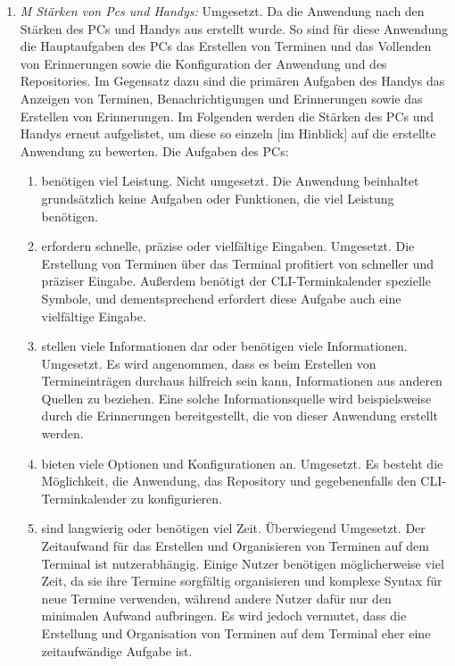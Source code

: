 \begin{enumerate}
	\item \textit{M Stärken von Pcs und Handys:}\newline%
		Umgesetzt. Da die Anwendung nach den Stärken des PCs und Handys aus  erstellt wurde. %
			So sind für diese Anwendung die Hauptaufgaben des PCs das Erstellen von Terminen und das Vollenden von Erinnerungen sowie die Konfiguration der Anwendung und des Repositories. Im Gegensatz dazu sind die primären Aufgaben des Handys das Anzeigen von Terminen, Benachrichtigungen und Erinnerungen sowie das Erstellen von Erinnerungen.\newline%
			Im Folgenden werden die Stärken des PCs und Handys erneut aufgelistet, um diese so einzeln [im Hinblick] auf die erstellte Anwendung zu bewerten.\newline%
		\myNewSection
		Die Aufgaben des PCs:%
  		\begin{enumerate}[label*={\arabic*}]
			\item benötigen viel Leistung.\newline%
				Nicht umgesetzt. Die Anwendung beinhaltet grundsätzlich keine Aufgaben oder Funktionen, die viel Leistung benötigen.%
			\item erfordern schnelle, präzise oder vielfältige Eingaben.\newline%
				Umgesetzt. Die Erstellung von Terminen über das Terminal profitiert von schneller und präziser Eingabe. Außerdem benötigt der CLI-Terminkalender spezielle Symbole, und dementsprechend erfordert diese Aufgabe auch eine vielfältige Eingabe.%
			\item stellen viele Informationen dar oder benötigen viele Informationen.\newline%
				Umgesetzt. Es wird angenommen, dass es beim Erstellen von Termineinträgen durchaus hilfreich sein kann, Informationen aus anderen Quellen zu beziehen. Eine solche Informationsquelle wird beispielsweise durch die Erinnerungen bereitgestellt, die von dieser Anwendung erstellt werden.
			\item bieten viele Optionen und Konfigurationen an.\newline%
				Umgesetzt. Es besteht die Möglichkeit, die Anwendung, das Repository und gegebenenfalls den CLI-Terminkalender zu konfigurieren.%
			\item sind langwierig oder benötigen viel Zeit.\newline%
				Überwiegend Umgesetzt. Der Zeitaufwand für das Erstellen und Organisieren von Terminen auf dem Terminal ist nutzerabhängig. Einige Nutzer benötigen möglicherweise viel Zeit, da sie ihre Termine sorgfältig organisieren und komplexe Syntax für neue Termine verwenden, während andere Nutzer dafür nur den minimalen Aufwand aufbringen. Es wird jedoch vermutet, dass die Erstellung und Organisation von Terminen auf dem Terminal eher eine zeitaufwändige Aufgabe ist.%

\end{enumerate}
\end{enumerate}
